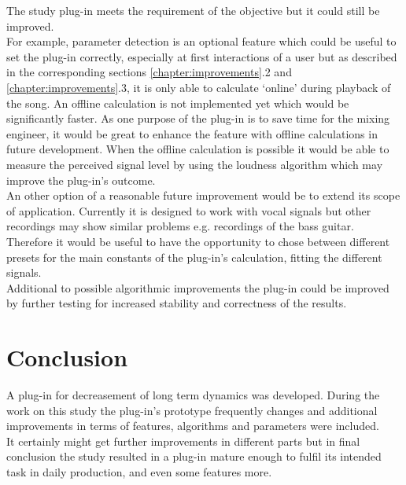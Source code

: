 The study plug-in meets the requirement of the objective but it could still be improved.\\
For example, parameter detection is an optional feature which could be useful to set the plug-in correctly, especially at first interactions of a user but as described in the corresponding sections \ref{chapter:improvements}.2 and \ref{chapter:improvements}.3, it is only able to calculate ‘online’ during playback of the song. An offline calculation is not implemented yet which would be significantly faster. As one purpose of the plug-in is to save time for the mixing engineer, it would be great to enhance the feature with offline calculations in future development. When the offline calculation is possible it would be able to measure the perceived signal level by using the loudness algorithm\cite{ITUalgo} which may improve the plug-in’s outcome.\\
An other option of a reasonable future improvement would be to extend its scope of application. Currently it is designed to work with vocal signals but other recordings may show similar problems e.g. recordings of the bass guitar. Therefore it would be useful to have the opportunity to chose between different presets for the main constants of the plug-in’s calculation, fitting the different signals.\\
Additional to possible algorithmic improvements the plug-in could be improved by further testing for increased stability and correctness of the results.\\

\section{Conclusion}

A plug-in for decreasement of long term dynamics was developed. During the work on this study the plug-in’s prototype frequently changes and additional improvements in terms of features, algorithms and parameters were included.\\
It certainly might get further improvements in different parts but in final conclusion the study resulted in a plug-in mature enough to fulfil its intended task in daily production, and even some features more.\\



